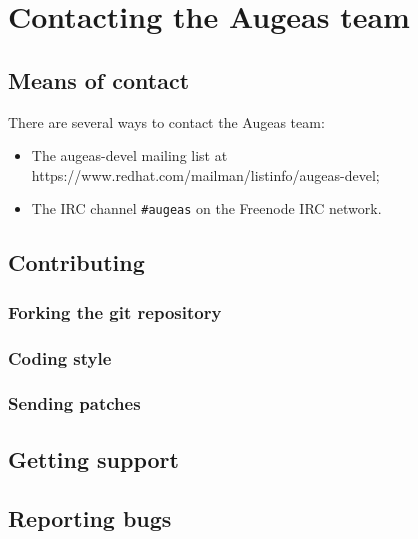 \chapter{Contacting the Augeas team}

\section{Means of contact}

There are several ways to contact the Augeas team:

\begin{itemize}
\item
  The augeas-devel mailing list at https://www.redhat.com/mailman/listinfo/augeas-devel;
\item
  The IRC channel \verb!#augeas! on the Freenode IRC network.
\end{itemize}
\section{Contributing}

\subsection{Forking the git repository}

\subsection{Coding style}

\subsection{Sending patches}

\section{Getting support}

\section{Reporting bugs}


